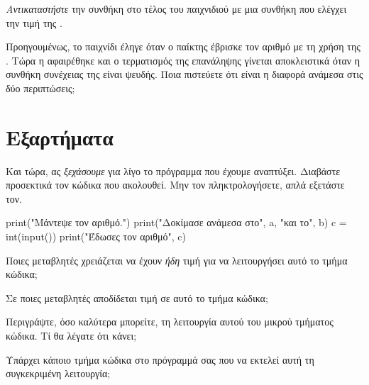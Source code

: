 \documentclass[a4paper,11pt,oneside]{book}
\begin{document}
\begin{step}
\emph{Αντικαταστήστε} την συνθήκη  στο τέλος του παιχνιδιού με μια συνθήκη που ελέγχει την τιμή της .
\end{step}

\begin{step}
Προηγουμένως, το παιχνίδι έληγε όταν ο παίκτης έβρισκε τον αριθμό με τη χρήση της . Τώρα η  αφαιρέθηκε και ο τερματισμός της επανάληψης γίνεται αποκλειστικά όταν η συνθήκη συνέχειας της  είναι ψευδής. Ποια πιστεύετε ότι είναι η διαφορά ανάμεσα στις δύο περιπτώσεις;

\marginnote[14pt]{\icondiscuss}
\dottedline

\dottedline

\dottedline

\end{step}

\section{Εξαρτήματα}

\begin{step}
Και τώρα, ας \emph{ξεχάσουμε} για λίγο το πρόγραμμα που έχουμε αναπτύξει. Διαβάστε προσεκτικά τον κώδικα που ακολουθεί. Μην τον πληκτρολογήσετε, απλά εξετάστε τον.

\begin{pyplain}
print("Μάντεψε τον αριθμό.")
print("Δοκίμασε ανάμεσα στο", a, "και το", b)
c = int(input())    
print("Έδωσες τον αριθμό", c)
\end{pyplain}

Ποιες μεταβλητές χρειάζεται να έχουν \emph{ήδη} τιμή για να λειτουργήσει αυτό το τμήμα κώδικα;

\marginnote[14pt]{\icondiscuss}
\dottedline

Σε ποιες μεταβλητές αποδίδεται τιμή σε αυτό το τμήμα κώδικα; 

\marginnote[14pt]{\icondiscuss}
\dottedline

Περιγράψτε, όσο καλύτερα μπορείτε, τη λειτουργία αυτού του μικρού τμήματος κώδικα. Τί θα λέγατε ότι κάνει;

\marginnote[14pt]{\icondiscuss}
\dottedline

\dottedline

\dottedline

Υπάρχει κάποιο τμήμα κώδικα στο πρόγραμμά σας που να εκτελεί αυτή τη συγκεκριμένη λειτουργία; 

\marginnote[14pt]{\icondiscuss}
\dottedline
\end{step}
\end{document}
